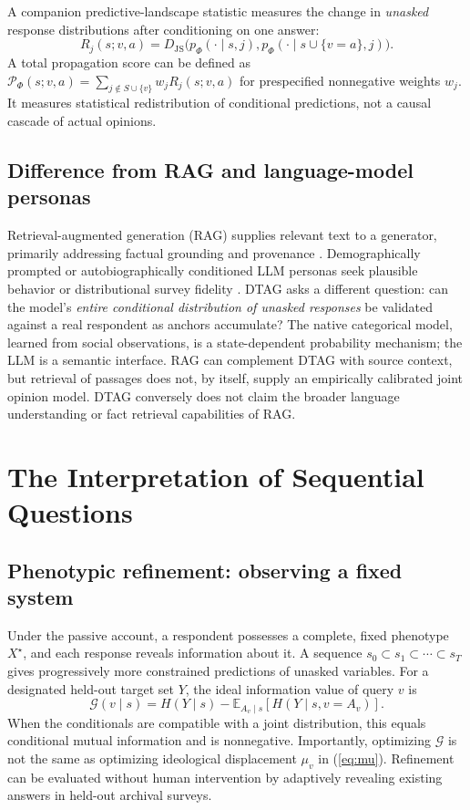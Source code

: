 \documentclass[journal,10pt]{IEEEtran}
\newcommand{\EE}{\mathbb{E}}
\newcommand{\JS}{D_{\mathrm{JS}}}
\newcommand{\Ph}{\Phi}
\begin{document}
A companion predictive-landscape statistic measures the change in \emph{unasked} response distributions after conditioning on one answer:
\begin{equation}
R_j(s;v,a)=\JS\!\bigl(p_\Ph(\cdot\mid s,j),
p_\Ph(\cdot\mid s\cup\{v=a\},j)\bigr).
\label{eq:ripple}
\end{equation}
A total propagation score can be defined as $\mathcal P_\Ph(s;v,a)=\sum_{j\notin S\cup\{v\}} w_j R_j(s;v,a)$ for prespecified nonnegative weights $w_j$. It measures statistical redistribution of conditional predictions, not a causal cascade of actual opinions.

\subsection{Difference from RAG and language-model personas}
Retrieval-augmented generation (RAG) supplies relevant text to a generator, primarily addressing factual grounding and provenance \cite{lewis2020}. Demographically prompted or autobiographically conditioned LLM personas seek plausible behavior or distributional survey fidelity \cite{argyle2023,park2023}. DTAG asks a different question: can the model's \emph{entire conditional distribution of unasked responses} be validated against a real respondent as anchors accumulate? The native categorical model, learned from social observations, is a state-dependent probability mechanism; the LLM is a semantic interface. RAG can complement DTAG with source context, but retrieval of passages does not, by itself, supply an empirically calibrated joint opinion model. DTAG conversely does not claim the broader language understanding or fact retrieval capabilities of RAG.

\section{The Interpretation of Sequential Questions}
\subsection{Phenotypic refinement: observing a fixed system}
Under the passive account, a respondent possesses a complete, fixed phenotype $X^\star$, and each response reveals information about it. A sequence $s_0\subset s_1\subset\cdots\subset s_T$ gives progressively more constrained predictions of unasked variables. For a designated held-out target set $Y$, the ideal information value of query $v$ is
\begin{equation}
\mathcal G(v\mid s)=
H(Y\mid s)-\EE_{A_v\mid s}[H(Y\mid s,v=A_v)].
\label{eq:ig}
\end{equation}
When the conditionals are compatible with a joint distribution, this equals conditional mutual information and is nonnegative. Importantly, optimizing $\mathcal G$ is not the same as optimizing ideological displacement $\mu_v$ in (\ref{eq:mu}). Refinement can be evaluated without human intervention by adaptively revealing existing answers in held-out archival surveys.
\end{document}
